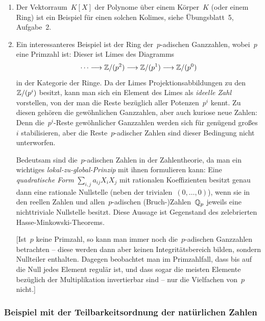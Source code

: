 \begin{enumerate}
\item
Der Vektorraum~$K[X]$ der Polynome über einem Körper~$K$ (oder einem Ring) ist
ein Beispiel für einen solchen Kolimes, siehe Übungsblatt~5, Aufgabe~2.

\item Ein interessanteres Beispiel ist der Ring der~$p$-adischen Ganzzahlen,
wobei~$p$ eine Primzahl ist: Dieser ist Limes des Diagramms
\[ \cdots \longrightarrow \mathbb{Z}/(p^2) \longrightarrow \mathbb{Z}/(p^1) \longrightarrow \mathbb{Z}/(p^0) \]
in der Kategorie der Ringe. Da der Limes Projektionsabbildungen zu
den~$\mathbb{Z}/(p^i)$ besitzt, kann man sich ein Element des Limes als \emph{ideelle
Zahl} vorstellen, von der man die Reste bezüglich aller Potenzen~$p^i$ kennt.
Zu diesen gehören die gewöhnlichen Ganzzahlen, aber auch kuriose neue Zahlen:
Denn die~$p^i$-Reste gewöhnlicher Ganzzahlen werden sich für genügend
großes~$i$ stabilisieren, aber die Reste~$p$-adischer Zahlen sind dieser Bedingung
nicht unterworfen.

Bedeutsam sind die~$p$-adischen Zahlen in der Zahlentheorie, da man ein wichtiges
\emph{lokal-zu-global-Prinzip} mit ihnen formulieren kann: Eine
\emph{quadratische Form} $\sum_{i,j} a_{ij} X_i X_j$ mit rationalen
Koeffizienten besitzt genau dann eine rationale Nullstelle (neben der
trivialen~$(0,\ldots,0)$), wenn sie in den reellen Zahlen und
allen~$p$-adischen (Bruch-)Zahlen~$\mathbb{Q}_p$ jeweils eine nichttriviale Nullstelle
besitzt. Diese Aussage ist Gegenstand des zelebrierten
Hasse-Minkowski-Theorems.

[Ist~$p$ keine Primzahl, so kann man immer noch die~$p$-adischen Ganzzahlen
betrachten -- diese werden dann aber keinen Integritätsbereich bilden, sondern
Nullteiler enthalten. Dagegen beobachtet man im Primzahlfall, dass bis auf die
Null jedes Element regulär ist, und dass sogar die meisten Elemente bezüglich
der Multiplikation invertierbar sind -- nur die Vielfachen von~$p$ nicht.]
\end{enumerate}


\subsubsection*{Beispiel mit der Teilbarkeitsordnung der natürlichen Zahlen}

